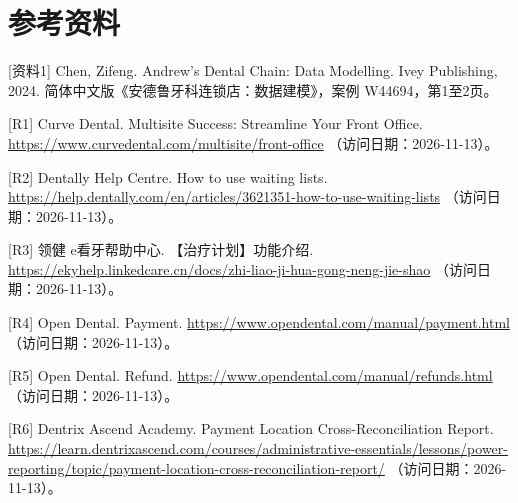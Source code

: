 \documentclass[UTF8,12pt,a4paper,fontset=none]{ctexart}
\begin{document}
\section*{参考资料}
\par\noindent\begin{minipage}{\linewidth}\raggedright [资料1] Chen, Zifeng. Andrew’s Dental Chain: Data Modelling. Ivey Publishing, 2024. 简体中文版《安德鲁牙科连锁店：数据建模》，案例 W44694，第1至2页。\end{minipage}\par
\par\noindent\begin{minipage}{\linewidth}\raggedright [R1] Curve Dental. Multisite Success: Streamline Your Front Office. \url{https://www.curvedental.com/multisite/front-office}\allowbreak{} （访问日期：2026-11-13）。\end{minipage}\par
\par\noindent\begin{minipage}{\linewidth}\raggedright [R2] Dentally Help Centre. How to use waiting lists. \url{https://help.dentally.com/en/articles/3621351-how-to-use-waiting-lists}\allowbreak{} （访问日期：2026-11-13）。\end{minipage}\par
\par\noindent\begin{minipage}{\linewidth}\raggedright [R3] 领健 e看牙帮助中心. 【治疗计划】功能介绍. \url{https://ekyhelp.linkedcare.cn/docs/zhi-liao-ji-hua-gong-neng-jie-shao}\allowbreak{} （访问日期：2026-11-13）。\end{minipage}\par
\par\noindent\begin{minipage}{\linewidth}\raggedright [R4] Open Dental. Payment. \url{https://www.opendental.com/manual/payment.html}\allowbreak{} （访问日期：2026-11-13）。\end{minipage}\par
\par\noindent\begin{minipage}{\linewidth}\raggedright [R5] Open Dental. Refund. \url{https://www.opendental.com/manual/refunds.html}\allowbreak{} （访问日期：2026-11-13）。\end{minipage}\par
\par\noindent\begin{minipage}{\linewidth}\raggedright [R6] Dentrix Ascend Academy. Payment Location Cross-Reconciliation Report. \url{https://learn.dentrixascend.com/courses/administrative-essentials/lessons/power-reporting/topic/payment-location-cross-reconciliation-report/}\allowbreak{} （访问日期：2026-11-13）。\end{minipage}\par
\end{document}
